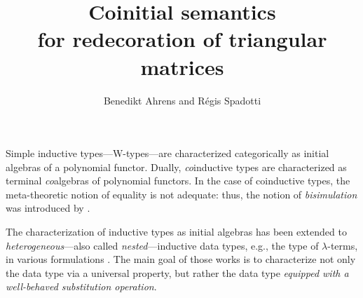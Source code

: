 \documentclass{llncs}
\begin{document}
\title{Coinitial semantics \\ for redecoration of triangular matrices}

\author{Benedikt Ahrens and R\'egis Spadotti}



%   
%   

\maketitle




 Simple inductive types---\textsf{W}-types---are characterized categorically as initial algebras of
 a polynomial functor.
 Dually, \emph{co}inductive types are characterized as terminal \emph{co}algebras of polynomial functors.
 In the case of coinductive types, the meta-theoretic notion of equality is not adequate: thus, the notion of 
 \emph{bisimulation} was introduced by \textcite{aczel_nonwellfounded}.

 
 The characterization of inductive types as initial algebras 
 has been extended to \emph{heterogeneous}---also called \emph{nested}---inductive data types, e.g., the type of $\lambda$-terms,
 in various formulations \parencite{fpt, DBLP:journals/iandc/HirschowitzM10}.
 The main goal of those works is to characterize not only the data type via a universal property, but rather the data type
 \emph{equipped with a well-behaved substitution operation}.
 
\end{document}

